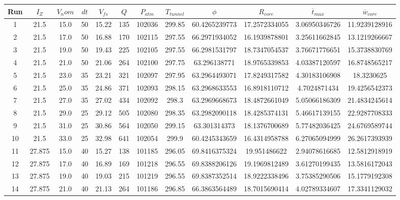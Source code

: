 \renewcommand\baselinestretch{1.3}\selectfont
\begin{table}[H]
\begin{center}
\begin{tabular}{|cccccccccccc|}
	\hline
	Run & $I_Z$ & $V_nom$ & $dt$ & $V_{fs}$ & $Q$ & $P_{atm}$ & $T_{tunnel}$ & $\phi$ & $R_{core}$ & $\overline{t}_{max}$ & $\overline{w}_{core}$\\
	\hline
	1 & 21.5 & 15.0 & 50 & 15.22 & 135 & 102036 & 299.85 & 60.4265239773 & 17.2572334055 & 3.06950346726 & 11.9239128916\\
	2 & 21.5 & 17.0 & 50 & 16.88 & 170 & 102115 & 297.55 & 66.2971934052 & 16.1939878801 & 3.25611662845 & 13.1219266667\\
	3 & 21.5 & 19.0 & 50 & 19.43 & 225 & 102105 & 297.55 & 66.2981531797 & 18.7347054537 & 3.76671776651 & 15.3738830769\\
	4 & 21.5 & 21.0 & 50 & 21.06 & 264 & 102100 & 297.75 & 63.296138771 & 18.9765339853 & 4.03387120597 & 16.8748565217\\
	5 & 21.5 & 23.0 & 35 & 23.21 & 321 & 102097 & 297.95 & 63.2964493071 & 17.8249317582 & 4.30183106908 & 18.3230625\\
	6 & 21.5 & 25.0 & 35 & 24.86 & 371 & 102093 & 298.15 & 63.2968633553 & 16.8918110712 & 4.7024871434 & 19.4256542373\\
	7 & 21.5 & 27.0 & 35 & 27.02 & 434 & 102092 & 298.3 & 63.2969668673 & 18.4872661049 & 5.05066186309 & 21.4834245614\\
	8 & 21.5 & 29.0 & 25 & 29.12 & 505 & 102080 & 298.35 & 63.2982090118 & 18.4285374131 & 5.46617139155 & 22.9287708333\\
	9 & 21.5 & 31.0 & 25 & 30.86 & 564 & 102050 & 299.15 & 63.301314373 & 18.1376700689 & 5.77482036425 & 24.6769589744\\
	10 & 21.5 & 33.0 & 25 & 32.98 & 641 & 102054 & 299.9 & 60.4245343659 & 16.4314958788 & 6.27065094999 & 26.2617393939\\
	11 & 27.875 & 15.0 & 40 & 15.27 & 138 & 101185 & 296.05 & 69.8416375324 & 19.951486622 & 2.94078616685 & 12.5812918919\\
	12 & 27.875 & 17.0 & 40 & 16.89 & 169 & 101218 & 296.55 & 69.8388206126 & 19.1969812489 & 3.61270199435 & 13.5816172043\\
	13 & 27.875 & 19.0 & 40 & 19.03 & 215 & 101219 & 296.55 & 69.8387352514 & 18.9222338496 & 3.75385290506 & 15.1779192308\\
	14 & 27.875 & 21.0 & 40 & 21.13 & 264 & 101186 & 296.85 & 66.3863564489 & 18.7015690414 & 4.02789334607 & 17.3341129032\\

\end{tabular}
\end{center}
\end{table}
